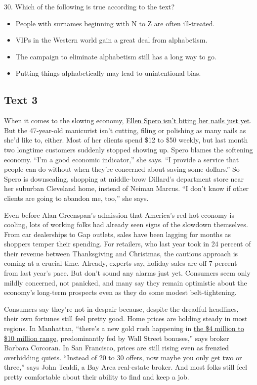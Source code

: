 \documentclass[UTF8,11pt]{ctexart}
\begin{document}
30. Which of the following is true according to the text?


\begin{itemize}[leftmargin=2em,itemsep=.2em,topsep=.4em]\item[A.] People with surnames beginning with N to Z are often ill-treated.
\item[B.] VIPs in the Western world gain a great deal from alphabetism.
\item[C.] The campaign to eliminate alphabetism still has a long way to go.
\item[D.] Putting things alphabetically may lead to unintentional bias.
\end{itemize}

\subsection*{\textbf{Text 3}}


When it comes to the slowing economy, \uline{Ellen Spero isn’t biting her nails just yet}. But the 47-year-old manicurist isn’t cutting, filing or polishing as many nails as she’d like to, either. Most of her clients spend \$12 to \$50 weekly, but last month two longtime customers suddenly stopped showing up. Spero blames the softening economy. “I’m a good economic indicator,” she says. “I provide a service that people can do without when they’re concerned about saving some dollars.” So Spero is downscaling, shopping at middle-brow Dillard’s department store near her suburban Cleveland home, instead of Neiman Marcus. “I don’t know if other clients are going to abandon me, too,” she says.


Even before Alan Greenspan’s admission that America’s red-hot economy is cooling, lots of working folks had already seen signs of the slowdown themselves. From car dealerships to Gap outlets, sales have been lagging for months as shoppers temper their spending. For retailers, who last year took in 24 percent of their revenue between Thanksgiving and Christmas, the cautious approach is coming at a crucial time. Already, experts say, holiday sales are off 7 percent from last year’s pace. But don’t sound any alarms just yet. Consumers seem only mildly concerned, not panicked, and many say they remain optimistic about the economy’s long-term prospects even as they do some modest belt-tightening.


Consumers say they’re not in despair because, despite the dreadful headlines, their own fortunes still feel pretty good. Home prices are holding steady in most regions. In Manhattan, “there’s a new gold rush happening in \uline{the \$4 million to \$10 million range}, predominantly fed by Wall Street bonuses,” says broker Barbara Corcoran. In San Francisco, prices are still rising even as frenzied overbidding quiets. “Instead of 20 to 30 offers, now maybe you only get two or three,” says John Tealdi, a Bay Area real-estate broker. And most folks still feel pretty comfortable about their ability to find and keep a job.
\end{document}
